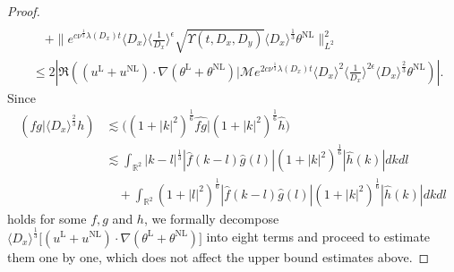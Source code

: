 \documentclass[reqno, 12pt]{amsart} %
\theoremstyle{plain} %
\theoremstyle{definition}
\theoremstyle{remark}
\numberwithin{equation}{section} %
\begin{document}
\begin{proof}
$$\begin{aligned}
			\\
			& \quad+\|e^{c \nu^{\frac{1}{3}} \lambda\left(D_x\right) t}\langle D_x\rangle\langle\frac{1}{D_x}\rangle^\epsilon \sqrt{\Upsilon\left(t, D_x, D_y\right)} \langle D_x \rangle^\frac13  \theta^{\mathrm{NL}}\|_{L^2}^2 \\
			& \leq 2\left|\Re\left((u^{\mathrm{L}}+u^{\mathrm{NL}}) \cdot \nabla(\theta^{\mathrm{L}}+\theta^{\mathrm{NL}}) \big| \mathcal{M} e^{2 c \nu^{\frac{1}{3}} \lambda\left(D_x\right) t}\langle D_x\rangle^2\langle\frac{1}{D_x}\rangle^{2 \epsilon}  \langle D_x \rangle^\frac23   \theta^{\mathrm{NL}}\right)\right|.
		\end{aligned}
		$$
		Since 
		\begin{align*}
			(fg| \langle D_x \rangle^\frac23 h) &\lesssim   \big((1+|k|^2)^\frac16 \widehat{fg}| (1+|k|^2)^\frac16 \hat{h} \big) \\
			&\lesssim \int_{\mathbb{R}^2}  |k-l|^\frac13|\hat{f}(k-l) \hat{g}(l)| (1+|k|^2)^\frac16 |\hat{h}(k)| dkdl \\
			&\quad  +  \int_{\mathbb{R}^2} (1 + |l|^2)^\frac16|\hat{f}(k-l) \hat{g}(l)| (1+|k|^2)^\frac16 |\hat{h}(k)| dkdl
		\end{align*}
        holds for some $f,g$ and $h$, we formally decompose $\langle D_x \rangle^\frac13 \big[(u^{\mathrm{L}}+u^{\mathrm{NL}}) \cdot \nabla(\theta^{\mathrm{L}}+\theta^{\mathrm{NL}}) \big] $ into eight terms and proceed to estimate them one by one, which does not affect the upper bound estimates above.
		
		
		

\end{proof}
\end{document}

